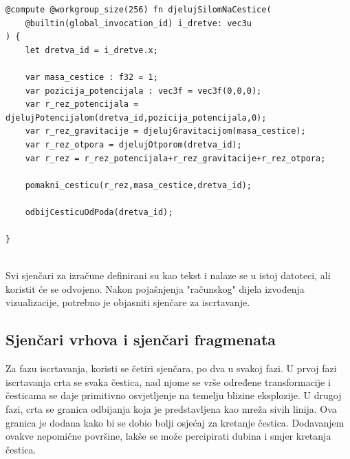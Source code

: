 \documentclass{foi}
\begin{document}
\begin{verbatim}
@compute @workgroup_size(256) fn djelujSilomNaCestice(
	@builtin(global_invocation_id) i_dretve: vec3u
) {
	let dretva_id = i_dretve.x;
	
	var masa_cestice : f32 = 1;
	var pozicija_potencijala : vec3f = vec3f(0,0,0);
	var r_rez_potencijala = djelujPotencijalom(dretva_id,pozicija_potencijala,0);
	var r_rez_gravitacije = djelujGravitacijom(masa_cestice);
	var r_rez_otpora = djelujOtporom(dretva_id);
	var r_rez = r_rez_potencijala+r_rez_gravitacije+r_rez_otpora;
	
	pomakni_cesticu(r_rez,masa_cestice,dretva_id);
	
	odbijCesticuOdPoda(dretva_id);
	
}
	
\end{verbatim}

Svi sjenčari za izračune definirani su kao tekst i nalaze se u istoj datoteci, ali koristit će se odvojeno. Nakon pojašnjenja "računskog" dijela izvođenja vizualizacije, potrebno je objasniti sjenčare za iscrtavanje. 
	
\subsection{Sjenčari vrhova i sjenčari fragmenata}
Za fazu iscrtavanja, koristi se četiri sjenčara, po dva u svakoj fazi. U prvoj fazi iscrtavanja crta se svaka čestica, nad njome se vrše određene transformacije i česticama se daje primitivno osvjetljenje na temelju blizine eksplozije. U drugoj fazi, crta se granica odbijanja koja je predstavljena kao mreža sivih linija. Ova granica je dodana kako bi se dobio bolji osjećaj za kretanje čestica. Dodavanjem ovakve nepomične površine, lakše se može percipirati dubina i smjer kretanja čestica.  
\end{document}
